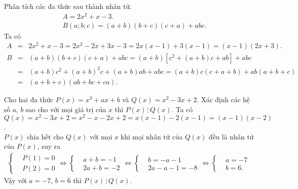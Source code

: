 \begin{bt}%
 Phân tích các đa thức sau thành nhân tử.
 \begin{eqnarray*}
  && A = 2x^2+x-3.\\
  && B(a;b;c) = (a+b)(b+c)(c+a)+abc.
 \end{eqnarray*}
 \loigiai
  {
  Ta có
  \allowdisplaybreaks
  \begin{eqnarray*}
   A &=& 2x^2+x-3 = 2x^2-2x+3x-3 = 2x(x-1)+3(x-1) = (x-1)(2x+3).\\
   B &=& (a+b)(b+c)(c+a)+abc = (a+b)\left[c^2 + (a+b)c + ab\right] + abc\\
   &=& (a+b)c^2+(a+b)^2c+(a+b)ab+abc = (a+b)c(c+a+b) + ab(a+b+c)\\
   &=& (a+b+c)(ab+bc+ca).
  \end{eqnarray*}
  }
\end{bt}

\begin{bt}%
 Cho hai đa thức $P(x) = x^3+ax+b$ và $Q(x) = x^2-3x+2$. Xác định các hệ số $a$, $b$ sao cho với mọi giá trị của $x$ thì $P(x) \,\vdots\, Q(x)$.
 \loigiai
  {
  Ta có $Q(x) = x^2-3x+2 = x^2-x-2x+2 = x(x-1)-2(x-1) = (x-1)(x-2)$.\\
  $P(x)$ chia hết cho $Q(x)$ với mọi $x$ khi mọi nhân tử của $Q(x)$ đều là nhân tử của $P(x)$, suy ra
  \allowdisplaybreaks
  \begin{eqnarray*}
   \left\{\begin{aligned}&P(1)=0 \\&P(2)=0\end{aligned}\right. \Leftrightarrow \left\{\begin{aligned}&a+b=-1 \\&2a+b=-2\end{aligned}\right. \Leftrightarrow \left\{\begin{aligned}&b=-a-1 \\&2a-a-1=-8 \end{aligned}\right. \Leftrightarrow \left\{\begin{aligned}&a=-7 \\&b=6. \end{aligned}\right.
  \end{eqnarray*}
  Vậy với $a=-7$, $b=6$ thì $P(x) \,\vdots\, Q(x)$.
  }
\end{bt}


